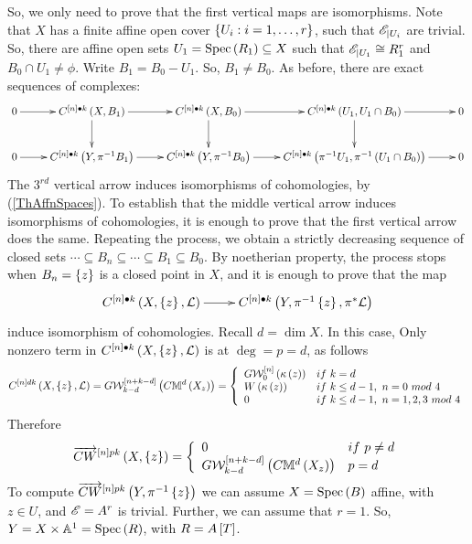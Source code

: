 \documentclass[12pt]{article}
\begin{document}
So,  we only need to prove that the first vertical maps are isomorphisms.  Note that $X$ has a finite affine open cover
$\LRs{U_i: i=1, \ldots, r}$, such that ${\SE}_{|U_i}$ are trivial.
So, there are affine open sets $U_1=\spec{R_1}\subseteq X$ such that  ${\SE}_{|U_1}\cong R_1^r$ and $B_0\cap U_1\neq \phi$. Write $B_1=B_0-U_1$. So, $B_1\neq B_0$. As before, there are exact sequences of complexes:
$$
\diagram 
0 \ar[r] & C^{\LRt{n}{\bul}k}\LRf{X, B_1} \ar[r]\ar[d] & C^{\LRt{n}{\bul}k}\LRf{X, B_0} \ar[r]\ar[d] & 
C^{\LRt{n}{\bul}k}\LRf{U_1, U_1\cap B_0} \ar[r]\ar[d] & 0\\
0 \ar[r] & C^{\LRt{n}{\bul}k}\LRf{Y, \pi^{-1}B_1} \ar[r] & C^{\LRt{n}{\bul}k}\LRf{Y, \pi^{-1}B_0} \ar[r] & 
C^{\LRt{n}{\bul}k}\LRf{\pi^{-1}U_1, \pi^{-1}\LRf{U_1\cap B_0}} \ar[r] & 0\\
\enddiagram 
$$
The $3^{rd}$ vertical arrow induces isomorphisms of cohomologies, by (\ref{ThAffnSpaces}). To establish that the middle vertical arrow  induces isomorphisms of cohomologies, it is enough to prove that the first vertical arrow does the same.
Repeating the process,
we obtain a strictly decreasing sequence of closed sets $\cdots \subseteq B_n \subseteq \cdots \subseteq B_1\subseteq B_0$. By noetherian property, the process stops when $B_n=\LRs{z}$ is a closed point in $X$, and it is enough to prove that the map 
$$
\diagram 
C^{\LRt{n}{\bul}k}\LRf{X, \LRs{z}, {\CL}} \ar[r] &
C^{\LRt{n}{\bul}k}\LRf{Y, \pi^{-1}\LRs{z}, \pi^*{\CL}} \\
\enddiagram
$$
induce isomorphism of cohomologies. Recall $d=\dim X$. In this case, Only nonzero term in
$C^{\LRt{n}{\bul}k}\LRf{X, \LRs{z}, {\CL}}$ is at $\deg=p=d$, as follows
$$
C^{\LRt{n}dk}\LRf{X, \LRs{z}, {\CL}} =G{\CW}_{k-d}^{\LRt{n+k-d}}\LRf{C{\BM}^d\LRf{X_{z}}}
= \LBrace{{ll} 
G{\CW}_0^{\LRt{n}}\LRf{\kappa\LRf{z}}& if~k=d\\
W\LRf{\kappa\LRf{z}} & if~ k\leq d-1,~n=0~mod~4\\
0 &if~  k\leq d-1,~ n=1, 2, 3~mod~4  }
$$
Therefore
$$
\ora{CW}^{\LRt{n}pk}\LRf{X, \LRs{z}} =\LBrace{{ll}
0 & if~p\neq d\\
G{\CW}_{k-d}^{\LRt{n+k-d}}\LRf{C{\BM}^d\LRf{X_{z}}}& p=d\\
}
$$
To compute $\ora{CW}^{\LRt{n}pk}\LRf{Y, \pi^{-1}\LRs{z}}$ we can assume $X=\spec{B}$ affine,
with $z\in U$, and ${\SE}=A^r$ is trivial. Further, we can assume that $r=1$. So, $Y= X\times {\BA}^1=\spec{R}$, with $R=A\LRt{T}$. 
\end{document}
